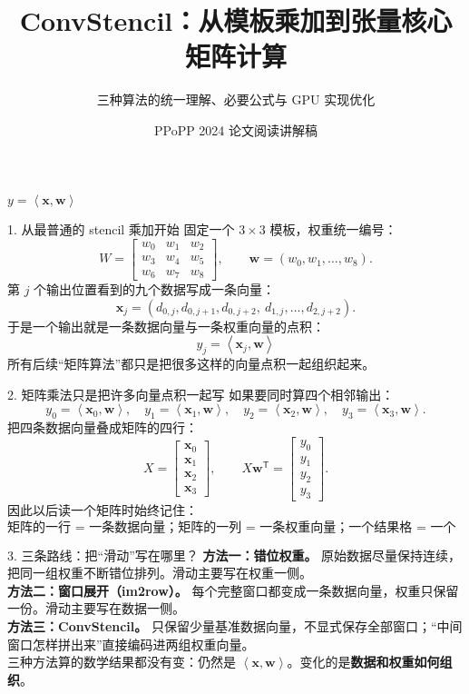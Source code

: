 \documentclass[aspectratio=169,11pt]{beamer}
\title{ConvStencil：从模板乘加到张量核心矩阵计算}
\subtitle{三种算法的统一理解、必要公式与 GPU 实现优化}
\author{}
\date{PPoPP 2024 论文阅读讲解稿}
\newcommand{\dotp}[2]{\left\langle #1,#2\right\rangle}
\begin{document}
\begin{frame}
  \titlepage
  \vspace{-0.8em}
  \centering
  \large \(y=\dotp{\bm{x}}{\bm{w}}\)
\end{frame}

\begin{frame}{1. 从最普通的 stencil 乘加开始}
\small
固定一个 \(3\times 3\) 模板，权重统一编号：
\[
W=\begin{bmatrix}
 w_0&w_1&w_2\\
 w_3&w_4&w_5\\
 w_6&w_7&w_8
\end{bmatrix},\qquad
\bm w=(w_0,w_1,\ldots,w_8).
\]
第 \(j\) 个输出位置看到的九个数据写成一条向量：
\[
\bm x_j=(d_{0,j},d_{0,j+1},d_{0,j+2},\ d_{1,j},\ldots,d_{2,j+2}).
\]
于是一个输出就是一条数据向量与一条权重向量的点积：
\[
\boxed{y_j=\dotp{\bm x_j}{\bm w}}
\]
所有后续“矩阵算法”都只是把很多这样的向量点积一起组织起来。
\end{frame}

\begin{frame}{2. 矩阵乘法只是把许多向量点积一起写}
\small
如果要同时算四个相邻输出：
\[
y_0=\dotp{\bm x_0}{\bm w},\quad
 y_1=\dotp{\bm x_1}{\bm w},\quad
 y_2=\dotp{\bm x_2}{\bm w},\quad
 y_3=\dotp{\bm x_3}{\bm w}.
\]
把四条数据向量叠成矩阵的四行：
\[
X=\begin{bmatrix}
\bm x_0\\ \bm x_1\\ \bm x_2\\ \bm x_3
\end{bmatrix},\qquad
X\bm w^{\mathsf T}=\begin{bmatrix}y_0\\y_1\\y_2\\y_3\end{bmatrix}.
\]
因此以后读一个矩阵时始终记住：
\[
\boxed{\text{矩阵的一行 = 一条数据向量；矩阵的一列 = 一条权重向量；一个结果格 = 一个点积。}}
\]
\end{frame}

\begin{frame}{3. 三条路线：把“滑动”写在哪里？}
\small
\textbf{方法一：错位权重。} 原始数据尽量保持连续，把同一组权重不断错位排列。滑动主要写在权重一侧。\\[0.6em]
\textbf{方法二：窗口展开（im2row）。} 每个完整窗口都变成一条数据向量，权重只保留一份。滑动主要写在数据一侧。\\[0.6em]
\textbf{方法三：ConvStencil。} 只保留少量基准数据向量，不显式保存全部窗口；“中间窗口怎样拼出来”直接编码进两组权重向量。\\[0.8em]
三种方法算的数学结果都没有变：仍然是 \(\dotp{\bm x}{\bm w}\)。变化的是\textbf{数据和权重如何组织}。
\end{frame}
\end{document}
